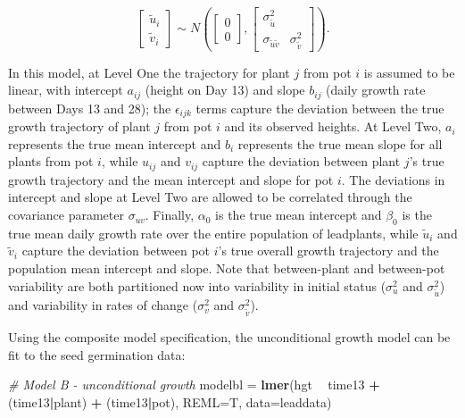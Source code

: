 \documentclass[
]{krantz}
\newenvironment{Shaded}{\begin{snugshade}}{\end{snugshade}}
\newcommand{\CommentTok}[1]{\textcolor[rgb]{0.37,0.37,0.37}{\textit{#1}}}
\newcommand{\DataTypeTok}[1]{\textcolor[rgb]{0.27,0.27,0.27}{#1}}
\newcommand{\KeywordTok}[1]{\textcolor[rgb]{0.27,0.27,0.27}{\textbf{#1}}}
\newcommand{\NormalTok}[1]{#1}
\newcommand{\OperatorTok}[1]{\textcolor[rgb]{0.43,0.43,0.43}{\textbf{#1}}}
\newcommand{\StringTok}[1]{\textcolor[rgb]{0.5,0.5,0.5}{#1}}
\begin{document}
\[ \left[ \begin{array}{c}
            \tilde{u}_{i} \\ \tilde{v}_{i}
          \end{array}  \right] \sim N \left( \left[
          \begin{array}{c}
            0 \\ 0
          \end{array} \right], \left[
          \begin{array}{cc}
            \sigma_{\tilde{u}}^{2} & \\
            \sigma_{\tilde{u}\tilde{v}} & \sigma_{\tilde{v}}^{2}
          \end{array} \right] \right). \]

In this model, at Level One the trajectory for plant \(j\) from pot \(i\) is assumed to be linear, with intercept \(a_{ij}\) (height on Day 13) and slope \(b_{ij}\) (daily growth rate between Days 13 and 28); the \(\epsilon_{ijk}\) terms capture the deviation between the true growth trajectory of plant \(j\) from pot \(i\) and its observed heights. At Level Two, \(a_{i}\) represents the true mean intercept and \(b_{i}\) represents the true mean slope for all plants from pot \(i\), while \(u_{ij}\) and \(v_{ij}\) capture the deviation between plant \(j\)'s true growth trajectory and the mean intercept and slope for pot \(i\). The deviations in intercept and slope at Level Two are allowed to be correlated through the covariance parameter \(\sigma_{uv}\). Finally, \(\alpha_{0}\) is the true mean intercept and \(\beta_{0}\) is the true mean daily growth rate over the entire population of leadplants, while \(\tilde{u}_{i}\) and \(\tilde{v}_{i}\) capture the deviation between pot \(i\)'s true overall growth trajectory and the population mean intercept and slope. Note that between-plant and between-pot variability are both partitioned now into variability in initial status (\(\sigma_{u}^{2}\) and \(\sigma_{\tilde{u}}^{2}\)) and variability in rates of change (\(\sigma_{v}^{2}\) and \(\sigma_{\tilde{v}}^{2}\)).

Using the composite model specification, the unconditional growth model can be fit to the seed germination data:

\begin{Shaded}
\begin{Highlighting}[]
\CommentTok{# Model B - unconditional growth}
\NormalTok{modelbl =}\StringTok{ }\KeywordTok{lmer}\NormalTok{(hgt }\OperatorTok{~}\StringTok{ }\NormalTok{time13 }\OperatorTok{+}\StringTok{ }\NormalTok{(time13}\OperatorTok{|}\NormalTok{plant) }\OperatorTok{+}\StringTok{ }\NormalTok{(time13}\OperatorTok{|}\NormalTok{pot),}
               \DataTypeTok{REML=}\NormalTok{T, }\DataTypeTok{data=}\NormalTok{leaddata)}
\end{Highlighting}
\end{Shaded}
\end{document}
